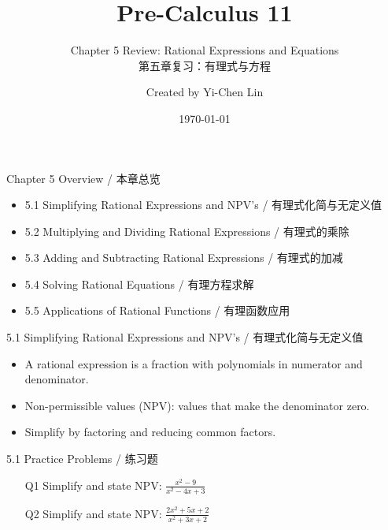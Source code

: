 \documentclass[aspectratio=169]{beamer}
\title{Pre-Calculus 11}
\subtitle{Chapter 5 Review: Rational Expressions and Equations \\ 第五章复习：有理式与方程}
\author{Created by Yi-Chen Lin}
\date{\today}
\begin{document}
\begin{frame}
    \titlepage
\end{frame}

\begin{frame}{Chapter 5 Overview / 本章总览}
    \begin{tcolorbox}[colback=lightgray,colframe=primary,title=Topics Covered]
        \footnotesize
        \begin{itemize}
            \item 5.1 Simplifying Rational Expressions and NPV's / 有理式化简与无定义值
            \item 5.2 Multiplying and Dividing Rational Expressions / 有理式的乘除
            \item 5.3 Adding and Subtracting Rational Expressions / 有理式的加减
            \item 5.4 Solving Rational Equations / 有理方程求解
            \item 5.5 Applications of Rational Functions / 有理函数应用
        \end{itemize}
    \end{tcolorbox}
\end{frame}

\begin{frame}{5.1 Simplifying Rational Expressions and NPV's / 有理式化简与无定义值}
    \begin{tcolorbox}[colback=lightgray,colframe=primary,title=Key Points / 重点]
        \footnotesize
        \begin{itemize}
            \item A rational expression is a fraction with polynomials in numerator and denominator.
            \item Non-permissible values (NPV): values that make the denominator zero.
            \item Simplify by factoring and reducing common factors.

        \end{itemize}
    \end{tcolorbox}
\end{frame}

\begin{frame}{5.1 Practice Problems / 练习题}
    \begin{tcolorbox}[colback=lightgray,colframe=accent,title=Practice]
        \footnotesize
        \begin{enumerate}
            \item[Q1] Simplify and state NPV: $\frac{x^2-9}{x^2-4x+3}$
            \item[Q2] Simplify and state NPV: $\frac{2x^2+5x+2}{x^2+3x+2}$
        \end{enumerate}
    \end{tcolorbox}
\end{frame}
\end{document}
